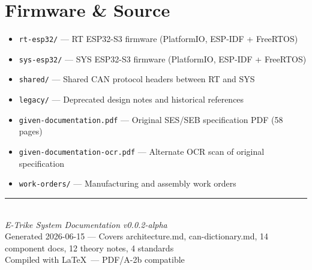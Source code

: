 \documentclass[12pt,a4paper,oneside]{report}
\begin{document}
\section{Firmware \& Source}

\begin{itemize}[leftmargin=*,nosep]
  \item \texttt{rt-esp32/} --- RT ESP32-S3 firmware (PlatformIO, ESP-IDF + FreeRTOS)
  \item \texttt{sys-esp32/} --- SYS ESP32-S3 firmware (PlatformIO, ESP-IDF + FreeRTOS)
  \item \texttt{shared/} --- Shared CAN protocol headers between RT and SYS
  \item \texttt{legacy/} --- Deprecated design notes and historical references
  \item \texttt{given-documentation.pdf} --- Original SES/SEB specification PDF (58 pages)
  \item \texttt{given-documentation-ocr.pdf} --- Alternate OCR scan of original specification
  \item \texttt{work-orders/} --- Manufacturing and assembly work orders
\end{itemize}

\vfill

\begin{center}
  \rule{0.5\textwidth}{0.4pt}\\[4mm]
  {\small\textit{E-Trike System Documentation v0.0.2-alpha}}\\[2mm]
  {\small Generated 2026-06-15 --- Covers architecture.md, can-dictionary.md, 14 component docs, 12 theory notes, 4 standards}\\[2mm]
  {\small Compiled with \LaTeX\ --- PDF/A-2b compatible}
\end{center}
\end{document}
